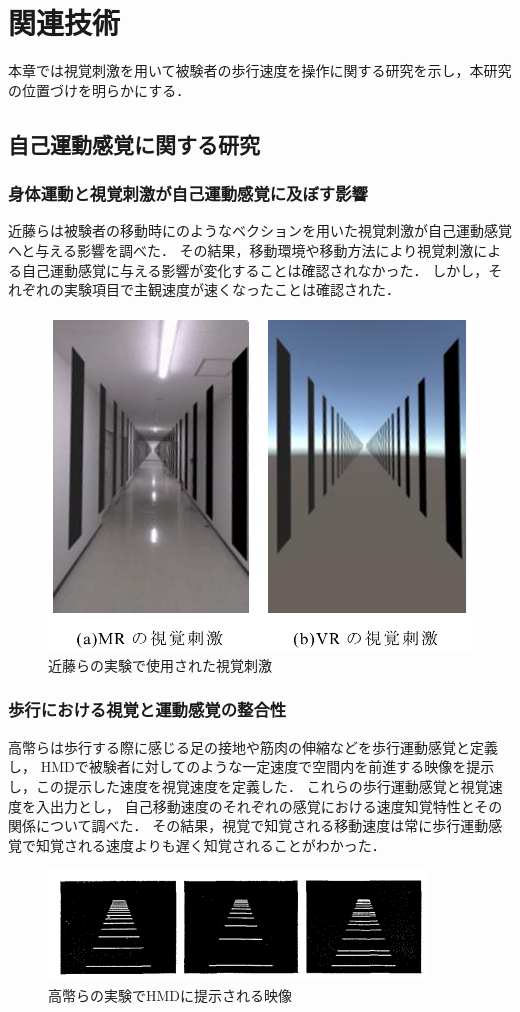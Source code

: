 \chapter{関連技術}
本章では視覚刺激を用いて被験者の歩行速度を操作に関する研究を示し，本研究の位置づけを明らかにする．
\section{自己運動感覚に関する研究}
\subsection{身体運動と視覚刺激が自己運動感覚に及ぼす影響}
近藤らは被験者の移動時にのようなベクションを用いた視覚刺激が自己運動感覚へと与える影響を調べた\cite{kondo}．
その結果，移動環境や移動方法により視覚刺激による自己運動感覚に与える影響が変化することは確認されなかった．
しかし，それぞれの実験項目で主観速度が速くなったことは確認された．
\begin{figure}[h]
    \centering
    \includegraphics[clip, width=0.8\linewidth]{fig/1.PNG}
    \caption{近藤らの実験で使用された視覚刺激}
    \label{fig:1}
\end{figure}

\subsection{歩行における視覚と運動感覚の整合性}
高幣らは歩行する際に感じる足の接地や筋肉の伸縮などを歩行運動感覚と定義し，
HMDで被験者に対してのような一定速度で空間内を前進する映像を提示し，この提示した速度を視覚速度を定義した．
これらの歩行運動感覚と視覚速度を入出力とし，
自己移動速度のそれぞれの感覚における速度知覚特性とその関係について調べた\cite{takahei}．
その結果，視覚で知覚される移動速度は常に歩行運動感覚で知覚される速度よりも遅く知覚されることがわかった．
\begin{figure}[h]
    \centering
    \includegraphics[clip, width=0.9\linewidth]{fig/2.PNG}
    \caption{高幣らの実験でHMDに提示される映像}
    \label{fig:2}
\end{figure}


